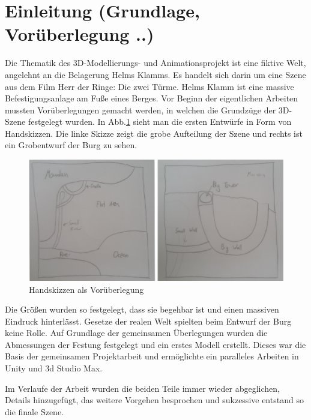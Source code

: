 \section{Einleitung (Grundlage, Vorüberlegung ..)}

Die Thematik des 3D-Modellierungs- und Animationsprojekt ist eine fiktive Welt, angelehnt an die Belagerung Helms Klamms. Es handelt sich darin um eine Szene aus dem Film Herr der Ringe: Die zwei Türme. Helms Klamm ist eine massive Befestigungsanlage am Fuße eines Berges. Vor Beginn der eigentlichen Arbeiten mussten Vorüberlegungen gemacht werden, in welchen die Grundzüge der 3D-Szene festgelegt wurden. In Abb.\ref{handskizze} sieht man die ersten Entwürfe in Form von Handskizzen. Die linke Skizze zeigt die grobe Aufteilung der Szene und rechts ist ein Grobentwurf der Burg zu sehen.

\begin{figure}[h]
	
	\centering
	\includegraphics[width=0.95\linewidth]{Abbildungen/Unity/Skizzen}
	\caption{Handskizzen als Vorüberlegung}
	\label{handskizze}
\end{figure}


Die Größen wurden so festgelegt, dass sie begehbar ist und einen massiven Eindruck hinterlässt. Gesetze der realen Welt spielten beim Entwurf der Burg keine Rolle. Auf Grundlage der gemeinsamen Überlegungen wurden die Abmessungen der Festung festgelegt und ein erstes Modell erstellt. Dieses war die Basis der gemeinsamen Projektarbeit und ermöglichte ein paralleles Arbeiten in Unity und 3d Studio Max.

Im Verlaufe der Arbeit wurden die beiden Teile immer wieder abgeglichen, Details hinzugefügt, das weitere Vorgehen besprochen und sukzessive entstand so die finale Szene. 